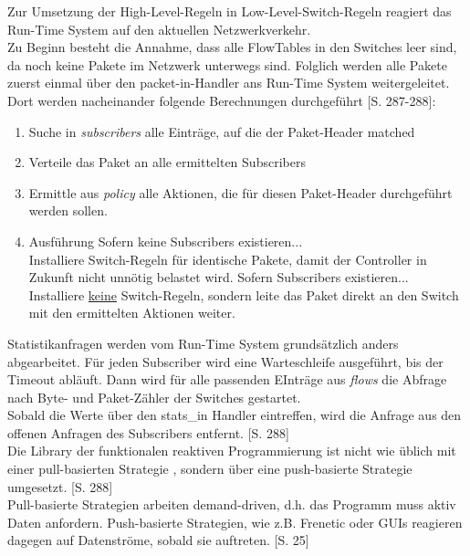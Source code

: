\documentclass[10pt,conference]{IEEEtran}
\begin{document}
Zur Umsetzung der High-Level-Regeln in Low-Level-Switch-Regeln reagiert das Run-Time System auf den aktuellen Netzwerkverkehr.\\
Zu Beginn besteht die Annahme, dass alle FlowTables in den Switches leer sind, da noch keine Pakete im Netzwerk unterwegs sind. Folglich werden alle Pakete zuerst einmal über den packet-in-Handler ans Run-Time System weitergeleitet. Dort werden nacheinander folgende Berechnungen durchgeführt \cite{4}[S. 287-288]:
\begin{enumerate}
	\item Suche in \textit{subscribers} alle Einträge, auf die der Paket-Header matched
	\item Verteile das Paket an alle ermittelten Subscribers
	\item Ermittle aus \textit{policy} alle Aktionen, die für diesen Paket-Header durchgeführt werden sollen.
	\item Ausführung
		\subitem Sofern keine Subscribers existieren...\\
		Installiere Switch-Regeln für identische Pakete, damit der Controller in Zukunft nicht unnötig belastet wird.
		\subitem Sofern Subscribers existieren...\\
		Installiere \underline{keine} Switch-Regeln, sondern leite das Paket direkt an den Switch mit den ermittelten Aktionen weiter.
\end{enumerate}
Statistikanfragen werden vom Run-Time System grundsätzlich anders abgearbeitet. Für jeden Subscriber wird eine Warteschleife ausgeführt, bis der Timeout abläuft. Dann wird für alle passenden EInträge aus \textit{flows} die Abfrage nach Byte- und Paket-Zähler der Switches gestartet.\\ 
Sobald die Werte über den stats\_in Handler eintreffen, wird die Anfrage aus den offenen Anfragen des Subscribers entfernt. \cite{4}[S. 288]\\
\newline
Die Library der funktionalen reaktiven Programmierung ist nicht wie üblich mit einer pull-basierten Strategie \cite{13}, sondern über eine push-basierte Strategie \cite{13} umgesetzt. \cite{4}[S. 288]\\
Pull-basierte Strategien arbeiten demand-driven, d.h. das Programm muss aktiv Daten anfordern. Push-basierte Strategien, wie z.B. Frenetic oder GUIs reagieren dagegen auf Datenströme, sobald sie auftreten. \cite{13}[S. 25]
\end{document}
